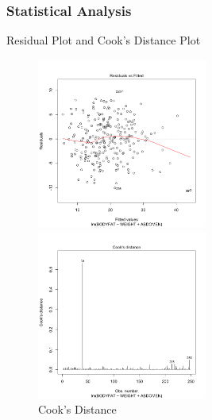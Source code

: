\documentclass{beamer}
\begin{document}
\begin{frame}
\frametitle{Statistical Analysis}

\begin{block}{Residual Plot and Cook's Distance Plot}

\begin{figure}
\begin{minipage}[t]{0.5\linewidth}
\centering
\includegraphics[width=2.2in]{residualplot.png}
\caption{Residual Plot}
\label{fig:side:a}
\end{minipage}%
\begin{minipage}[t]{0.5\linewidth}
\centering
\includegraphics[width=2.2in]{cookplot}
\caption{Cook's Distance}
\label{fig:side:b}
\end{minipage}
\end{figure}

\end{block}
\end{frame}
\end{document}
